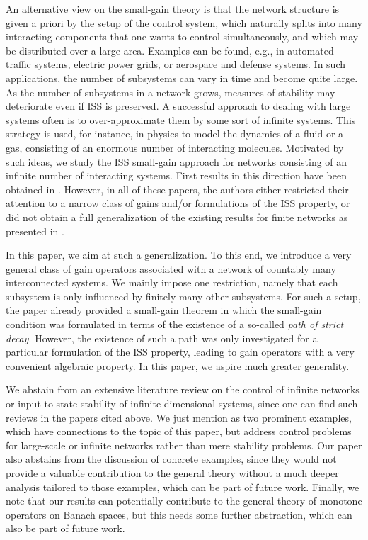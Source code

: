 \documentclass[10pt, oneside, a4paper]{article}
\begin{document}
An alternative view on the small-gain theory is that the network structure is given a priori by the setup of the control system, which naturally splits into many interacting components that one wants to control simultaneously, and which may be distributed over a large area. Examples can be found, e.g., in automated traffic systems, electric power grids, or aerospace and defense systems. In such applications, the number of subsystems can vary in time and become quite large. As the number of subsystems in a network grows, measures of stability may deteriorate even if ISS is preserved. A successful approach to dealing with large systems often is to over-approximate them by some sort of infinite systems. This strategy is used, for instance, in physics to model the dynamics of a fluid or a gas, consisting of an enormous number of interacting molecules. Motivated by such ideas, we study the ISS small-gain approach for networks consisting of an infinite number of interacting systems. First results in this direction have been obtained in \cite{Dea,DPa,Kea,KMZ,KZa,KMG,Mea}. However, in all of these papers, the authors either restricted their attention to a narrow class of gains and/or formulations of the ISS property, or did not obtain a full generalization of the existing results for finite networks as presented in \cite{DR1,DR2,KJi,Ruf}.%

In this paper, we aim at such a generalization. To this end, we introduce a very general class of gain operators associated with a network of countably many interconnected systems. We mainly impose one restriction, namely that each subsystem is only influenced by finitely many other subsystems. For such a setup, the paper \cite{KMZ} already provided a small-gain theorem in which the small-gain condition was formulated in terms of the existence of a so-called \emph{path of strict decay}. However, the existence of such a path was only investigated for a particular formulation of the ISS property, leading to gain operators with a very convenient algebraic property. In this paper, we aspire much greater generality.%

We abstain from an extensive literature review on the control of infinite networks or input-to-state stability of infinite-dimensional systems, since one can find such reviews in the papers cited above. We just mention \cite{Bea,Be2} as two prominent examples, which have connections to the topic of this paper, but address control problems for large-scale or infinite networks rather than mere stability problems. Our paper also abstains from the discussion of concrete examples, since they would not provide a valuable contribution to the general theory without a much deeper analysis tailored to those examples, which can be part of future work. Finally, we note that our results can potentially contribute to the general theory of monotone operators on Banach spaces, but this needs some further abstraction, which can also be part of future work.%
\end{document}
